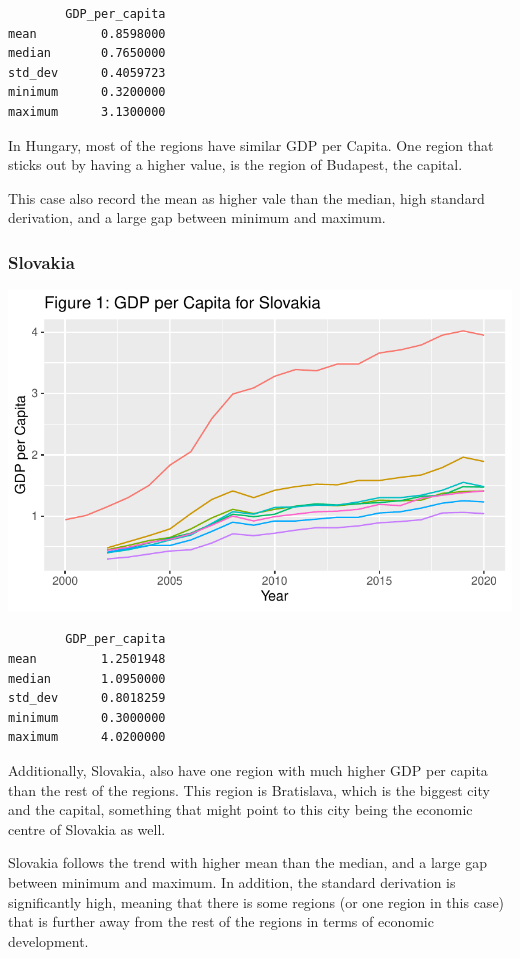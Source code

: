 \documentclass[
  a4paper,
  DIV=11,
  numbers=noendperiod]{scrartcl}
\begin{document}
\begin{verbatim}
        GDP_per_capita
mean         0.8598000
median       0.7650000
std_dev      0.4059723
minimum      0.3200000
maximum      3.1300000
\end{verbatim}

In Hungary, most of the regions have similar GDP per Capita. One region
that sticks out by having a higher value, is the region of Budapest, the
capital.

This case also record the mean as higher vale than the median, high
standard derivation, and a large gap between minimum and maximum.

\hypertarget{slovakia}{%
\subsubsection{Slovakia}\label{slovakia}}

\includegraphics{MSB104_GR_1_Final_Assignment_research_article_files/figure-pdf/unnamed-chunk-16-1.pdf}

\begin{verbatim}
        GDP_per_capita
mean         1.2501948
median       1.0950000
std_dev      0.8018259
minimum      0.3000000
maximum      4.0200000
\end{verbatim}

Additionally, Slovakia, also have one region with much higher GDP per
capita than the rest of the regions. This region is Bratislava, which is
the biggest city and the capital, something that might point to this
city being the economic centre of Slovakia as well.

Slovakia follows the trend with higher mean than the median, and a large
gap between minimum and maximum. In addition, the standard derivation is
significantly high, meaning that there is some regions (or one region in
this case) that is further away from the rest of the regions in terms of
economic development.
\end{document}
